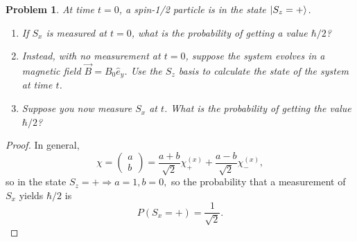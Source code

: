 \documentclass{article}
\newtheorem{plm}{Problem}
\begin{document}
\begin{plm}
  At time $t = 0$, a spin-1/2 particle is in the state $\ket{S_{z} = +}$.
  \begin{enumerate}
  \item If $S_{x}$ is measured at $t = 0$, what is the probability of getting a value $\hbar/2$?
  \item Instead, with no measurement at $t = 0$, suppose the system evolves in a magnetic field $\vec{B} = B_{0}\hat{e}_{y}$.
    Use the $S_{z}$ basis to calculate the state of the system at time $t$.
  \item Suppose you now measure $S_{x}$ at $t$.
    What is the probability of getting the value $\hbar/2$?
  \end{enumerate}
\end{plm}

\begin{proof}
  In general,
  \[
    \chi =
    \begin{pmatrix}
      a \\
      b
    \end{pmatrix}
    = \frac{a + b}{\sqrt{2}}\chi_{+}^{(x)} + \frac{a - b}{\sqrt{2}}\chi_{-}^{(x)},
  \]
  so in the state $S_{z} = + \Rightarrow a = 1, b = 0,$ so the probability that a measurement of $S_{x}$ yields $\hbar / 2$ is
  \[
    P(S_{x} = +) = \frac{1}{\sqrt{2}}.
  \]


\end{proof}
\end{document}
